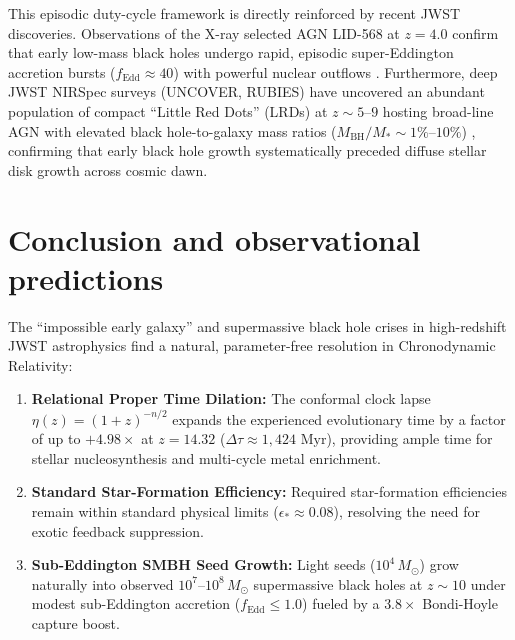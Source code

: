 \documentclass[aps,prd,reprint,superscriptaddress,nofootinbib,floatfix,amsmath,amssymb]{revtex4-2}
\begin{document}
This episodic duty-cycle framework is directly reinforced by recent JWST discoveries. Observations of the X-ray selected AGN LID-568 at $z = 4.0$ confirm that early low-mass black holes undergo rapid, episodic super-Eddington accretion bursts ($f_{\text{Edd}} \approx 40$) with powerful nuclear outflows \cite{Suh2024_LID568}. Furthermore, deep JWST NIRSpec surveys (UNCOVER, RUBIES) have uncovered an abundant population of compact ``Little Red Dots'' (LRDs) at $z \sim 5\text{--}9$ hosting broad-line AGN with elevated black hole-to-galaxy mass ratios ($M_{\text{BH}}/M_* \sim 1\%\text{--}10\%$) \cite{Greene2024_UNCOVER_LRDs,Kokorev2024_LRD_Overmassive}, confirming that early black hole growth systematically preceded diffuse stellar disk growth across cosmic dawn.

\section{Conclusion and observational predictions}
\label{sec:conclusion}

The ``impossible early galaxy'' and supermassive black hole crises in high-redshift JWST astrophysics find a natural, parameter-free resolution in Chronodynamic Relativity:

\begin{enumerate}
    \item \textbf{Relational Proper Time Dilation:} The conformal clock lapse $\eta(z) = (1+z)^{-n/2}$ expands the experienced evolutionary time by a factor of up to $+4.98\times$ at $z = 14.32$ ($\Delta\tau \approx 1,424\text{ Myr}$), providing ample time for stellar nucleosynthesis and multi-cycle metal enrichment.
    \item \textbf{Standard Star-Formation Efficiency:} Required star-formation efficiencies remain within standard physical limits ($\epsilon_* \approx 0.08$), resolving the need for exotic feedback suppression.
    \item \textbf{Sub-Eddington SMBH Seed Growth:} Light seeds ($10^4\,M_\odot$) grow naturally into observed $10^7\text{--}10^8\,M_\odot$ supermassive black holes at $z \sim 10$ under modest sub-Eddington accretion ($f_{\text{Edd}} \le 1.0$) fueled by a $3.8\times$ Bondi-Hoyle capture boost.
\end{enumerate}
\end{document}
